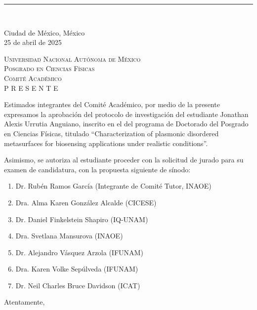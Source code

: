 \documentclass[letter,11pt]{article}
\begin{document}
\noindent \textcolor{Blue}{\rule{\textwidth}{1mm}}\\[-2.5em]
%
\begin{flushright}
	Ciudad de México, México\\ 25 de abril de 2025
\end{flushright}
\vspace{-5em}


{\large%
\noindent
\textsc{Universidad Nacional Autónoma de México}\\
\textsc{Posgrado en Ciencias Físicas}\\
\textsc{Comité Académico}\\
\textsc{P R E S E N T E }
}

\vspace*{3em}

\noindent
Estimados integrantes del Comité Académico, por medio de la presente  expresamos la aprobación del protocolo de investigación del estudiante Jonathan Alexis Urrutia Anguiano, inscrito en el del programa de Doctorado del Posgrado en Ciencias Físicas, titulado ``Characterization of plasmonic disordered metasurfaces for biosensing applications under realistic conditions''.

Asimismo, se autoriza al estudiante proceder con la solicitud de jurado para su
examen de candidatura, con la propuesta siguiente de sínodo:

\begin{enumerate}
	\setlength\itemsep{-.5em}
	\item Dr. Rubén Ramos García (Integrante de Comité Tutor, INAOE)
	\item Dra. Alma Karen González Alcalde (CICESE)
	\item Dr. Daniel Finkelstein Shapiro (IQ-UNAM)
	\item Dra. Svetlana Mansurova (INAOE)
	\item Dr. Alejandro Vásquez Arzola (IFUNAM)
	\item Dra. Karen Volke Sepúlveda  (IFUNAM)
	\item Dr. Neil Charles Bruce Davidson (ICAT)
\end{enumerate}




\vfill
Atentamente,
\end{document}

